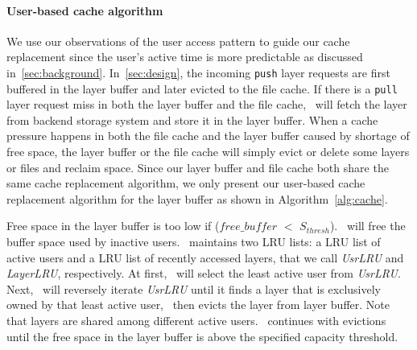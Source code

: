 \paragraph{User-based cache algorithm}



We use our observations of the user access pattern to guide our cache replacement
since the user's active time is more predictable as discussed in~\cref{sec:background}.
In~\cref{sec:design}, the incoming \texttt{push} layer requests are first buffered in the layer buffer and later evicted to the file cache.
If there is a \texttt{pull} layer request miss in both the layer buffer and the file cache, 
\sysname~will fetch the layer from backend storage system and store it in the layer buffer.
When a cache pressure happens in both the file cache and the layer buffer caused by shortage of free space,
the layer buffer or the file cache will simply evict or delete some layers or files and reclaim space.
Since our layer buffer and file cache both share the same cache replacement algorithm, we only present
our user-based cache replacement algorithm for the layer buffer  as shown in Algorithm~\ref{alg:cache}.

Free space in the layer buffer is too low if ($free\_buffer$ $<$ $S_{thresh}$). 
\sysname~will free the buffer space used by inactive users. 
\sysname~maintains two LRU lists: a LRU list of active users and
a LRU list of recently accessed layers, that we call \emph{UsrLRU} and \emph{LayerLRU}, respectively.
At first, \sysname~will select the least active user from \emph{UsrLRU}.
Next, \sysname~will reversely iterate \emph{UsrLRU} until it finds a layer that is exclusively owned by that least active user, 
\sysname~then evicts the layer from layer buffer. 
 Note that layers are shared among different active users.
 \sysname~continues with evictions until the free space in the layer buffer is above the specified capacity threshold.
 


